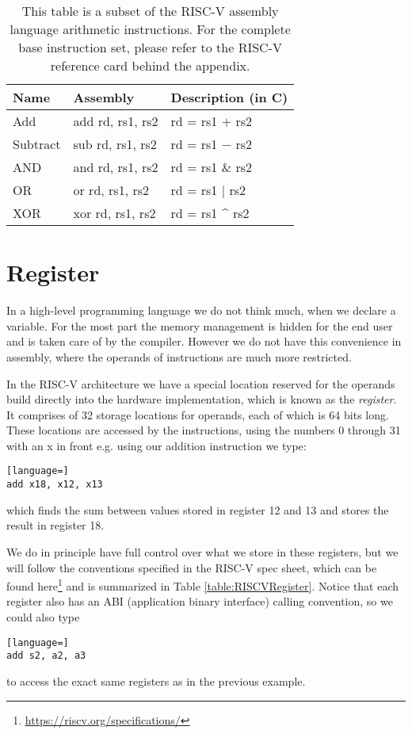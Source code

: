     \begin{table}[h!]
        \centering
        \begin{tabular}{|l|l|l|}
        	\hline
        	Name     & Assembly         & Description (in C) \\ \hline
        	Add      & add rd, rs1, rs2 & rd = rs1 $+$ rs2   \\
        	Subtract & sub rd, rs1, rs2 & rd = rs1 $-$ rs2   \\
        	AND      & and rd, rs1, rs2 & rd = rs1 \& rs2    \\
        	OR       & or rd, rs1, rs2  & rd = rs1 $|$ rs2   \\
        	XOR      & xor rd, rs1, rs2 & rd = rs1 \^{} rs2  \\ \hline
        \end{tabular}
        \caption{This table is a subset of the RISC-V assembly language arithmetic instructions. For the complete base instruction set, please refer to the RISC-V reference card behind the appendix.}
        \label{table:RISCVInstructions}
    \end{table}

\section{Register}\label{section:Register}
    In a high-level programming language we do not think much, when we declare a variable. For the most part the memory management is hidden for the end user and is taken care of by the compiler. However we do not have this convenience in assembly, where the operands of instructions are much more restricted. 
    
    In the RISC-V architecture we have a special location reserved for the operands build directly into the hardware implementation, which is known as the \textit{register}. It comprises of 32 storage locations for operands, each of which is 64 bits long. These locations are accessed by the instructions, using the numbers 0 through 31 with an x in front e.g. using our addition instruction we type:
    \begin{lstlisting}[language=]
add x18, x12, x13
    \end{lstlisting}
     which finds the sum between values stored in register 12 and 13 and stores the result in register 18.
     
     We do in principle have full control over what we store in these registers, but we will follow the conventions specified in the RISC-V spec sheet, which can be found here\footnote{\url{https://riscv.org/specifications/}} and is summarized in Table \ref{table:RISCVRegister}. Notice that each register also has an ABI (application binary interface) calling convention, so we could also type
     \begin{lstlisting}[language=]
add s2, a2, a3
     \end{lstlisting}
     to access the exact same registers as in the previous example.
     
